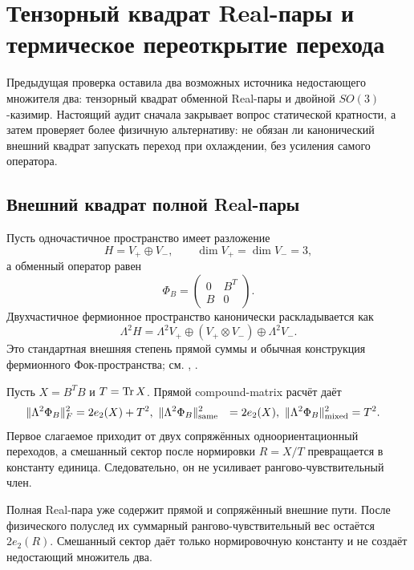 \chapter{Тензорный квадрат Real-пары и термическое переоткрытие перехода}

Предыдущая проверка оставила два возможных источника недостающего множителя
два: тензорный квадрат обменной Real-пары и двойной $SO(3)$-казимир.
Настоящий аудит сначала закрывает вопрос статической кратности, а затем
проверяет более физичную альтернативу: не обязан ли канонический внешний
квадрат запускать переход при охлаждении, без усиления самого оператора.

\section{Внешний квадрат полной Real-пары}

Пусть одночастичное пространство имеет разложение
\begin{equation}
 H=V_+\oplus V_-,
 \qquad \dim V_+=\dim V_-=3,
\end{equation}
а обменный оператор равен
\begin{equation}
 \Phi_B=
 \begin{pmatrix}0&B^T\\B&0\end{pmatrix}.
\end{equation}
Двухчастичное фермионное пространство канонически раскладывается как
\begin{equation}
 \Lambda^2H
 =\Lambda^2V_+
 \oplus(V_+\otimes V_-)
 \oplus\Lambda^2V_-.
 \label{eq:v6-real-pair-exterior-decomposition}
\end{equation}
Это стандартная внешняя степень прямой суммы и обычная конструкция
фермионного Фок-пространства; см.
, .

Пусть $X=B^TB$ и $T=\operatorname{Tr} X$. Прямой compound-matrix расчёт даёт
\begin{align}
 \|\Lambda^2\Phi_B\|_F^2
 &=2e_2(X)+T^2,\
 \|\Lambda^2\Phi_B\|^2_{\rm same}
 &=2e_2(X),\
 \|\Lambda^2\Phi_B\|^2_{\rm mixed}
 &=T^2.
 \label{eq:v6-real-pair-exterior-norm-split}
\end{align}
Первое слагаемое приходит от двух сопряжённых одноориентационный переходов,
а смешанный сектор после нормировки $R=X/T$ превращается в константу единица.
Следовательно, он не усиливает рангово-чувствительный член.

\begin{theorem}
Полная Real-пара уже содержит прямой и сопряжённый внешние пути. После
физического полуслед их суммарный рангово-чувствительный вес остаётся
$2e_2(R)$. Смешанный сектор даёт только нормировочную константу и не
создаёт недостающий множитель два.
\end{theorem}

